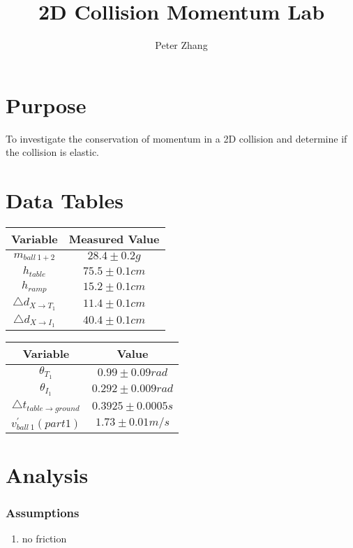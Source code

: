 \documentclass[12pt]{article}
\title{2D Collision Momentum Lab}
\author{Peter Zhang}
\begin{document}
\maketitle
\newpage


\section{Purpose}
To investigate the conservation of momentum in a 2D collision and determine if the collision is elastic.

\section{Data Tables}

\begin{center}
\begin{tabular}{|c|c|}
\hline
Variable & Measured Value\\
\hline
\hline
$m_{ball\ 1+2}$ & $28.4 \pm 0.2g$\\
\hline
$h_{table}$ & $75.5\pm0.1cm$\\
\hline
$h_{ramp}$ & $15.2\pm0.1cm$\\
\hline
$\triangle{d}_{X\rightarrow{}T_{1}}$ & $11.4\pm0.1cm$\\
\hline
$\triangle{d}_{X\rightarrow{}I_{1}}$ & $40.4\pm0.1cm$\\
\hline
\end{tabular}

\begin{tabular}{|c|c|}
\hline
Variable & Value\\
\hline
\hline
$\theta{}_{T_{1}} $ & $0.99\pm0.09rad$\\
\hline
$\theta{}_{I_{1}} $ & $0.292\pm0.009rad$\\
\hline
$\triangle{t_{table\rightarrow ground}}$ & $0.3925\pm0.0005s$\\
\hline
$v^{'}_{ball\ 1} (part 1)$ & $1.73\pm0.01m/s$\\
\hline
\end{tabular}

\end{center}


\section{Analysis}
\subsubsection{Assumptions}
\begin{enumerate}
\item no friction
\end{enumerate}
\end{document}
